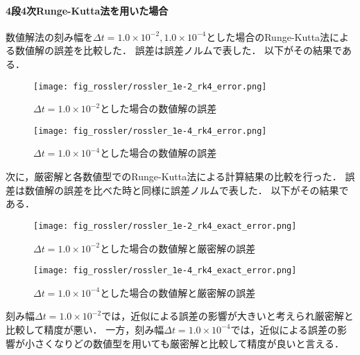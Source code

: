 \paragraph*{4段4次Runge-Kutta法を用いた場合}
数値解法の刻み幅を$\Delta t = 1.0 \times 10^{-2},1.0 \times 10^{-4}$とした場合のRunge-Kutta法による数値解の誤差を比較した．
誤差は誤差ノルムで表した．
以下がその結果である．
\begin{figure}[H]
    \centering
    \begin{minipage}[b]{0.49\columnwidth}
        \centering
        \texttt{[image: fig\_rossler/rossler\_1e-2\_rk4\_error.png]}
        \caption{$\Delta t = 1.0 \times 10^{-2}$とした場合の数値解の誤差}
        \label{fig:rossler_1e-2_rk4_error}
    \end{minipage}
    \begin{minipage}[b]{0.49\columnwidth}
        \centering
        \texttt{[image: fig\_rossler/rossler\_1e-4\_rk4\_error.png]}
        \caption{$\Delta t = 1.0 \times 10^{-4}$とした場合の数値解の誤差}
        \label{fig:rossler_1e-4_rk4_error}
    \end{minipage}   
\end{figure}


次に，厳密解と各数値型でのRunge-Kutta法による計算結果の比較を行った．
誤差は数値解の誤差を比べた時と同様に誤差ノルムで表した．
以下がその結果である．\\
\begin{figure}[H]
    \centering
    \begin{minipage}[b]{0.49\columnwidth}
        \centering
        \texttt{[image: fig\_rossler/rossler\_1e-2\_rk4\_exact\_error.png]}
        \caption{$\Delta t = 1.0 \times 10^{-2}$とした場合の数値解と厳密解の誤差}   
        \label{fig:rossler_1e-2_exact_error}
    \end{minipage}
    \begin{minipage}[b]{0.49\columnwidth}
        \centering
        \texttt{[image: fig\_rossler/rossler\_1e-4\_rk4\_exact\_error.png]}
        \caption{$\Delta t = 1.0 \times 10^{-4}$とした場合の数値解と厳密解の誤差}
        \label{fig:rossler_1e-4_exact_error}
    \end{minipage}
\end{figure}
刻み幅$\Delta t = 1.0 \times 10^{-2}$では，近似による誤差の影響が大きいと考えられ厳密解と比較して精度が悪い．
一方，刻み幅$\Delta t = 1.0 \times 10^{-4}$では，近似による誤差の影響が小さくなりどの数値型を用いても厳密解と比較して精度が良いと言える．

